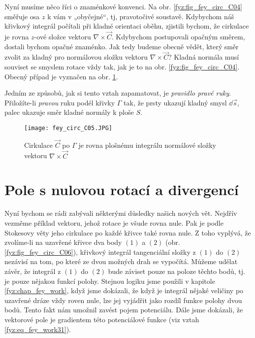     Nyní musíme něco říci o znaménkové konvenci. Na obr. \ref{fyz:fig_fey_circ_C04} směřuje osa 
    \(z\) k vám v „obyčejné“, tj, pravotočivé soustavě. Kdybychom náš křivkový integrál počítali při 
    kladné orientaci oběhu, zjistili bychom, že cirkulace je rovna \(z\)-ové složce vektoru 
    \(\nabla\times\vec{C}\). Kdybychom postupovali opačným směrem, dostali bychom opačné znaménko. 
    Jak tedy budeme obecně vědět, který směr zvolit za kladný pro normálovou složku vektoru 
    \(\nabla\times\vec{C}\)? Kladná normála musí souviset se smyslem rotace vždy tak, jak je to na 
    obr. \ref{fyz:fig_fey_circ_C04}. Obecný případ je vyznačen na obr. \ref{fyz:fig_fey_circ_C05}.

    Jedním ze způsobů, jak si tento vztah zapamatovat, je \emph{pravidlo pravé ruky}. Přiložíte-li
    \emph{pravou} ruku podél křivky \(\Gamma\) tak, že prsty ukazují kladný smysl \(\dd{\vec{s}}\), 
    palec ukazuje směr kladné normály k ploše \(S\).

    \begin{figure}
      \centering
      \texttt{[image: fey\_circ\_C05.JPG]}
      \caption{Cirkulace \(\vec{C}\) po \(\Gamma\) je rovna plošnému integrálu normálové složky
               vektoru \(\nabla\times\vec{C}\)}
      \label{fyz:fig_fey_circ_C05}   
    \end{figure}                    

  \section{Pole s nulovou rotací a divergencí}
    Nyní bychom se rádi zabývali některými důsledky našich nových vět. Nejdřív vezměme příklad 
    vektoru, jehož rotace je všude rovna nule. Pak je podle Stokesovy věty jeho cirkulace po každé 
    křivce také rovna nule. Z toho vyplývá, že zvolíme-li na uzavřené křivce dva body \((1)\) a 
    \((2)\) (obr. \ref{fyz:fig_fey_circ_C06}), křivkový integrál tangenciální složky z \((1)\) do 
    \((2)\) nezávisí na tom, po které ze dvou možných drah se vypočítá. Můžeme udělat závěr, že 
    integrál z \((1)\) do \((2)\) bude záviset pouze na poloze těchto bodů, tj. je pouze nějakou 
    funkcí polohy. Stejnou logiku jsme použili v kapitole \ref{fyz:chap_fey_work}, když jsme 
    dokázali, že když je integrál nějaké veličiny po uzavřené dráze vždy roven nule, lze jej 
    vyjádřit jako rozdíl funkce polohy dvou bodů. Tento fakt nám umožnil zavést pojem potenciálu. 
    Dále jsme dokázali, že vektorové pole je gradientem této potenciálové funkce (viz vztah 
    \ref{fyz:eq_fey_work31}).
    

